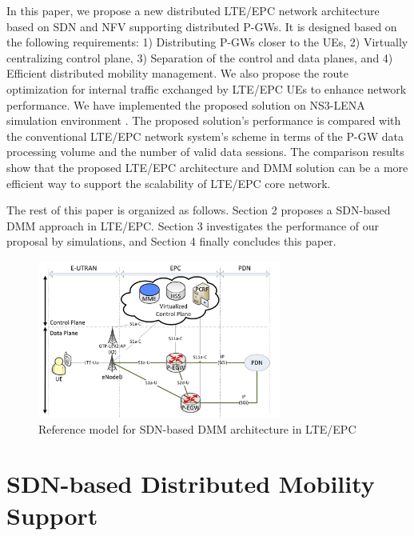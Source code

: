\documentclass[runningheads,a4paper]{llncs}
\begin{document}
In this paper, we propose a new distributed LTE/EPC network architecture based on SDN and NFV supporting distributed P-GWs. It is designed based on the following requirements: 1) Distributing P-GWs closer to the UEs, 2) Virtually centralizing control plane, 3) Separation of the control and data planes, and 4) Efficient distributed mobility management. We also propose the route optimization for internal traffic exchanged by LTE/EPC UEs to enhance network performance. We have implemented the proposed solution on NS3-LENA simulation environment \cite{ref13-1}. The proposed solution's performance is compared with the conventional LTE/EPC network system's scheme in terms of the P-GW data processing volume and the number of valid data sessions. The comparison results show that the proposed LTE/EPC architecture and DMM solution can be a more efficient way to support the scalability of LTE/EPC core network.

The rest of this paper is organized as follows. Section 2 proposes a SDN-based DMM approach in LTE/EPC. Section 3 investigates the performance of our proposal by simulations, and Section 4 finally concludes this paper.

\begin{figure}[t]
\begin{center}
\includegraphics[width=8cm]{figures/fig1.pdf}
\end{center}\vspace{-0.6cm}
\caption{Reference model for SDN-based DMM architecture in LTE/EPC}
\label{fig:f1}\vspace{-0.6cm}
\end{figure}


\section{SDN-based Distributed Mobility Support}
\vspace{-0.2cm}
\end{document}
